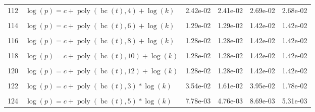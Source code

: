\documentclass[12pt,a4paper]{article}
\DeclareMathOperator{\bc}{bc}
\DeclareMathOperator{\poly}{poly}
\begin{document}
\begin{longtable}[t]{ll>{\raggedleft\arraybackslash}p{2cm}>{\raggedleft\arraybackslash}p{2cm}>{\raggedleft\arraybackslash}p{2cm}>{\raggedleft\arraybackslash}p{2cm}}
112 & $\log(p) = c + \poly\left( \bc(t), 4 \right) + \log(k)$ & 2.42e-02 & 2.41e-02 & 2.69e-02 & 2.68e-02\\
\cellcolor{gray!6}{113} & \cellcolor{gray!6}{$\log(p) = c + \poly\left( \bc(t), 5 \right) + \log(k)$} & \cellcolor{gray!6}{1.59e-02} & \cellcolor{gray!6}{1.40e-02} & \cellcolor{gray!6}{1.77e-02} & \cellcolor{gray!6}{1.55e-02}\\
114 & $\log(p) = c + \poly\left( \bc(t), 6 \right) + \log(k)$ & 1.29e-02 & 1.29e-02 & 1.42e-02 & 1.42e-02\\
\cellcolor{gray!6}{115} & \cellcolor{gray!6}{$\log(p) = c + \poly\left( \bc(t), 7 \right) + \log(k)$} & \cellcolor{gray!6}{1.30e-02} & \cellcolor{gray!6}{1.30e-02} & \cellcolor{gray!6}{1.43e-02} & \cellcolor{gray!6}{1.43e-02}\\
116 & $\log(p) = c + \poly\left( \bc(t), 8 \right) + \log(k)$ & 1.28e-02 & 1.28e-02 & 1.42e-02 & 1.42e-02\\
\cellcolor{gray!6}{117} & \cellcolor{gray!6}{$\log(p) = c + \poly\left( \bc(t), 9 \right) + \log(k)$} & \cellcolor{gray!6}{1.28e-02} & \cellcolor{gray!6}{1.28e-02} & \cellcolor{gray!6}{1.42e-02} & \cellcolor{gray!6}{1.42e-02}\\
118 & $\log(p) = c + \poly\left( \bc(t), 10 \right) + \log(k)$ & 1.28e-02 & 1.28e-02 & 1.42e-02 & 1.42e-02\\
\cellcolor{gray!6}{119} & \cellcolor{gray!6}{$\log(p) = c + \poly\left( \bc(t), 11 \right) + \log(k)$} & \cellcolor{gray!6}{1.28e-02} & \cellcolor{gray!6}{1.28e-02} & \cellcolor{gray!6}{1.42e-02} & \cellcolor{gray!6}{1.42e-02}\\
120 & $\log(p) = c + \poly\left( \bc(t), 12 \right) + \log(k)$ & 1.28e-02 & 1.28e-02 & 1.42e-02 & 1.42e-02\\
\cellcolor{gray!6}{121} & \cellcolor{gray!6}{$\log(p) = c + \poly\left( \bc(t), 13 \right) + \log(k)$} & \cellcolor{gray!6}{1.28e-02} & \cellcolor{gray!6}{1.28e-02} & \cellcolor{gray!6}{1.42e-02} & \cellcolor{gray!6}{1.42e-02}\\
122 & $\log(p) = c + \poly\left( \bc(t), 3 \right) * \log(k)$ & 3.54e-02 & 1.61e-02 & 3.95e-02 & 1.78e-02\\
\cellcolor{gray!6}{123} & \cellcolor{gray!6}{$\log(p) = c + \poly\left( \bc(t), 4 \right) * \log(k)$} & \cellcolor{gray!6}{1.88e-02} & \cellcolor{gray!6}{1.87e-02} & \cellcolor{gray!6}{2.09e-02} & \cellcolor{gray!6}{2.08e-02}\\
124 & $\log(p) = c + \poly\left( \bc(t), 5 \right) * \log(k)$ & 7.78e-03 & 4.76e-03 & 8.69e-03 & 5.31e-03\\

\end{longtable}
\end{document}
